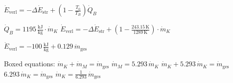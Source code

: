 \( \dot{E}_{\text{verl}} = -\Delta \dot{E}_{\text{str}} + \left( 1 - \frac{T_0}{T_B} \right) \dot{Q}_B \)  

\( \dot{Q}_B = 1195 \, \frac{\text{kJ}}{\text{kg}} \cdot \dot{m}_K \)  
\( \dot{E}_{\text{verl}} = -\Delta \dot{E}_{\text{str}} + \left( 1 - \frac{243.15 \, \text{K}}{1289 \, \text{K}} \right) \cdot \dot{m}_K \)  

\( \dot{E}_{\text{verl}} = -100 \, \frac{\text{kJ}}{\text{kg}} + 0.129 \, \dot{m}_{\text{ges}} \)  

Boxed equations:  
\( \dot{m}_K + \dot{m}_M = \dot{m}_{\text{ges}} \)  
\( \dot{m}_M = 5.293 \, \dot{m}_K \)  
\( \dot{m}_K + 5.293 \, \dot{m}_K = \dot{m}_{\text{ges}} \)  
\( 6.293 \, \dot{m}_K = \dot{m}_{\text{ges}} \)  
\( \dot{m}_K = \frac{1}{6.293} \, \dot{m}_{\text{ges}} \)